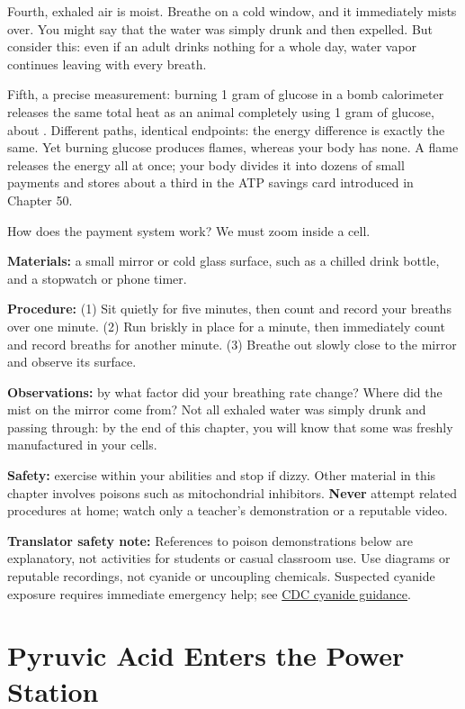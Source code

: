Fourth, exhaled air is moist. Breathe on a cold window, and it immediately mists over. You might say that the water was simply drunk and then expelled. But consider this: even if an adult drinks nothing for a whole day, water vapor continues leaving with every breath.

Fifth, a precise measurement: burning 1 gram of glucose in a bomb calorimeter releases the same total heat as an animal completely using 1 gram of glucose, about . Different paths, identical endpoints: the energy difference is exactly the same. Yet burning glucose produces flames, whereas your body has none. A flame releases the energy all at once; your body divides it into dozens of small payments and stores about a third in the ATP savings card introduced in Chapter 50.

How does the payment system work? We must zoom inside a cell.

\begin{shiyan}
\textbf{Materials:} a small mirror or cold glass surface, such as a chilled drink bottle, and a stopwatch or phone timer.

\textbf{Procedure:} (1) Sit quietly for five minutes, then count and record your breaths over one minute. (2) Run briskly in place for a minute, then immediately count and record breaths for another minute. (3) Breathe out slowly close to the mirror and observe its surface.

\textbf{Observations:} by what factor did your breathing rate change? Where did the mist on the mirror come from? Not all exhaled water was simply drunk and passing through: by the end of this chapter, you will know that some was freshly manufactured in your cells.

\textbf{Safety:} exercise within your abilities and stop if dizzy. Other material in this chapter involves poisons such as mitochondrial inhibitors. \textbf{Never} attempt related procedures at home; watch only a teacher's demonstration or a reputable video.

\textbf{Translator safety note:} References to poison demonstrations below are explanatory, not activities for students or casual classroom use. Use diagrams or reputable recordings, not cyanide or uncoupling chemicals. Suspected cyanide exposure requires immediate emergency help; see \href{https://www.cdc.gov/chemical-emergencies/chemical-fact-sheets/cyanide.html}{CDC cyanide guidance}.
\end{shiyan}

\section{Pyruvic Acid Enters the Power Station}


